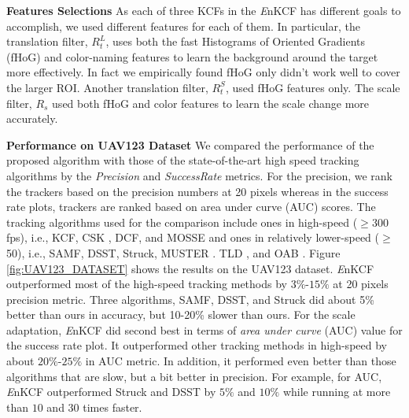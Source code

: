 \documentclass{bmvc2k}
\begin{document}
\textbf{Features Selections} As each of three KCFs in the {\it E}nKCF
has different goals to accomplish, we used different features for each
of them. In particular, the translation filter, $R_{t}^{L}$, uses both
the fast Histograms of Oriented Gradients (fHoG)
\cite{felzenszwalb2010object} and color-naming \cite{van2009learning}
features to learn the background around the target more
effectively. In fact we empirically found fHoG only didn't work well
to cover the larger ROI. Another translation filter, $R_{t}^{S}$, used
fHoG features only. The scale filter, $R_{s}$ used both fHoG and color
features to learn the scale change more accurately.

\textbf{Performance on UAV123 Dataset} We compared the performance of
the proposed algorithm with those of the state-of-the-art high speed
tracking algorithms by the \textit{Precision} and
\textit{Success\:Rate} metrics. For the precision, we rank the
trackers based on the precision numbers at 20 pixels whereas in the
success rate plots, trackers are ranked based on area under curve
(AUC) scores. The tracking algorithms used for the comparison include
ones in high-speed ($\geq$300 fps), i.e., KCF\cite{henriques2015high},
CSK \cite{henriques2012exploiting}, DCF\cite{henriques2015high}, and
MOSSE\cite{bolme2010visual,henriques2015high} and ones in relatively
lower-speed ($\geq$50), i.e., SAMF\cite{li2014scale},
DSST\cite{danelljan2014accurate}, Struck\cite{hare2012efficient},
MUSTER \cite{hong2015multi}. TLD \cite{kalal2012tracking}, and OAB
\cite{zhang2012robust}. Figure \ref{fig:UAV123_DATASET} shows the
results on the UAV123 dataset. {\it E}nKCF outperformed most of the
high-speed tracking methods by $3\%$-$15\%$ at 20 pixels precision
metric. Three algorithms, SAMF, DSST, and Struck did about 5\% better
than ours in accuracy, but 10-20\% slower than ours. For the scale
adaptation, {\it E}nKCF did second best in terms of \textit{area under
  curve} (AUC) value for the success rate plot. It outperformed other
tracking methods in high-speed by about $20\%$-$25\%$ in AUC
metric. In addition, it performed even better than those algorithms
that are slow, but a bit better in precision. For example, for AUC,
{\it E}nKCF outperformed Struck and DSST by $5\%$ and $10\%$ while
running at more than $10$ and $30$ times faster.
\end{document}
